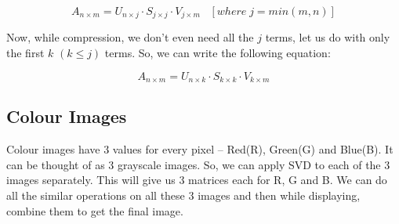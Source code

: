 		$$A_{n\times m} = U_{n\times j}\cdot S_{j\times j}\cdot V_{j\times m}\;\;\;[where\;j = min(m, n)]$$

		Now, while compression, we don't even need all the $j$ terms, let us do with only the first $k$ $(k\leq j)$ terms. So, we can write the following equation:

		$$A_{n\times m} = U_{n\times k}\cdot S_{k\times k}\cdot V_{k\times m}$$

	\subsection{Colour Images}
		Colour images have 3 values for every pixel -- Red(R), Green(G) and Blue(B). It can be thought of as 3 grayscale images. So, we can apply SVD to each of the 3 images separately. This will give us 3 matrices each for R, G and B. We can do all the similar operations on all these 3 images and then while displaying, combine them to get the final image.
